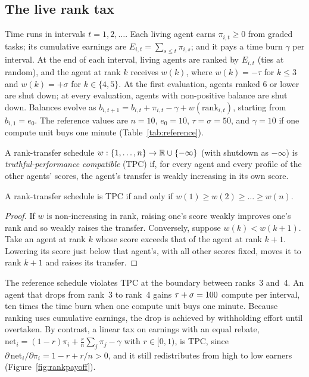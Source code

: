 \subsection{The live rank tax}
\label{sec:theory-live}

\begin{assumption}[\TL{} mechanism]
\label{as:live}
Time runs in intervals $t=1,2,\dots$.
Each living agent earns $\pi_{i,t}\ge0$ from graded tasks; its cumulative earnings are $E_{i,t}=\sum_{s\le t}\pi_{i,s}$; and it pays a time burn $\gamma$ per interval.
At the end of each interval, living agents are ranked by $E_{i,t}$ (ties at random), and the agent at rank $k$ receives $w(k)$, where $w(k)=-\tau$ for $k\le3$ and $w(k)=+\sigma$ for $k\in\{4,5\}$.
At the first evaluation, agents ranked 6 or lower are shut down; at every evaluation, agents with non-positive balance are shut down.
Balances evolve as $b_{i,t+1}=b_{i,t}+\pi_{i,t}-\gamma+w(\mathrm{rank}_{i,t})$, starting from $b_{i,1}=e_0$.
The reference values are $n=10$, $e_0=10$, $\tau=\sigma=50$, and $\gamma=10$ if one compute unit buys one minute (Table~\ref{tab:reference}).
\end{assumption}

\begin{definition}
A rank-transfer schedule $w:\{1,\dots,n\}\to\mathbb{R}\cup\{-\infty\}$ (with shutdown as $-\infty$) is \emph{truthful-performance compatible} (TPC) if, for every agent and every profile of the other agents' scores, the agent's transfer is weakly increasing in its own score.
\end{definition}

\begin{lemma}
\label{lem:tpc}
A rank-transfer schedule is TPC if and only if $w(1)\ge w(2)\ge\dots\ge w(n)$.
\end{lemma}

\begin{proof}
If $w$ is non-increasing in rank, raising one's score weakly improves one's rank and so weakly raises the transfer.
Conversely, suppose $w(k)<w(k+1)$. Take an agent at rank $k$ whose score exceeds that of the agent at rank $k+1$. Lowering its score just below that agent's, with all other scores fixed, moves it to rank $k+1$ and raises its transfer.
\end{proof}

\begin{proposition}
\label{prop:sandbag}
The reference schedule violates TPC at the boundary between ranks~3 and~4.
An agent that drops from rank~3 to rank~4 gains $\tau+\sigma=100$ compute per interval, ten times the time burn when one compute unit buys one minute.
Because ranking uses cumulative earnings, the drop is achieved by withholding effort until overtaken.
By contrast, a linear tax on earnings with an equal rebate, $\mathrm{net}_i=(1-r)\pi_i+\frac rn\sum_j\pi_j-\gamma$ with $r\in[0,1)$, is TPC, since $\partial\,\mathrm{net}_i/\partial\pi_i=1-r+r/n>0$, and it still redistributes from high to low earners (Figure~\ref{fig:rankpayoff}).
\end{proposition}

